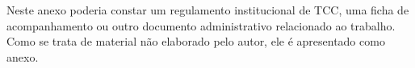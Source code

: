 %
%
%
%
%


Neste anexo poderia constar um regulamento institucional de TCC, uma ficha de acompanhamento ou outro documento administrativo relacionado ao trabalho. Como se trata de material não elaborado pelo autor, ele é apresentado como anexo.
